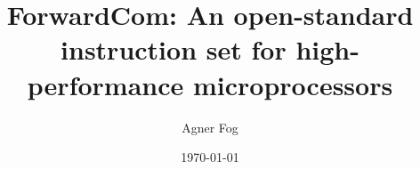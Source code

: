 \documentclass[11pt,a4paper,oneside,openright]{report}
\begin{document}
\title{ForwardCom: An open-standard instruction set for high-performance microprocessors}
\author{Agner Fog}
\date{\today}
\maketitle
\RaggedRight

\tableofcontents
\setcounter{secnumdepth}{1}
























\end{document}
